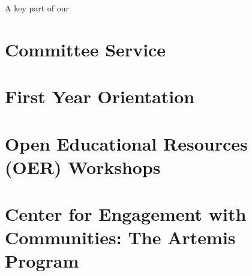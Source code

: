 \documentclass[../../main.tex]{subfiles}
\begin{document}
\label{sec:service}

A key part of our 

\section{Committee Service}

\begin{flushleft}

\end{flushleft}

\section{First Year Orientation}

\begin{flushleft}

\end{flushleft}

\section{Open Educational Resources (OER) Workshops}

\begin{flushleft}

\end{flushleft}

\section{Center for Engagement with Communities: The Artemis Program}
\label{sec:cec2}

\begin{flushleft}

\end{flushleft}
\end{document}
